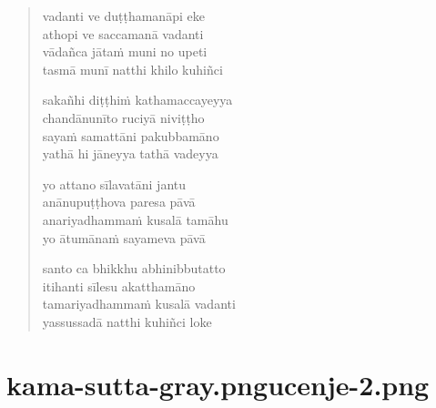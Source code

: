 

\cleartoverso

\vspace*{30mm}

\begin{verse}

vadanti ve duṭṭhamanāpi eke\\
athopi ve saccamanā vadanti\\
vādañca jātaṁ muni no upeti\\
tasmā munī natthi khilo kuhiñci

sakañhi diṭṭhiṁ kathamaccayeyya\\
chandānunīto ruciyā niviṭṭho\\
sayaṁ samattāni pakubbamāno\\
yathā hi jāneyya tathā vadeyya

yo attano sīlavatāni jantu\\
anānupuṭṭhova paresa pāvā\\
anariyadhammaṁ kusalā tamāhu\\
yo ātumānaṁ sayameva pāvā

santo ca bhikkhu abhinibbutatto\\
itihanti sīlesu akatthamāno\\
tamariyadhammaṁ kusalā vadanti\\
yassussadā natthi kuhiñci loke

\end{verse}


\chapter[Duṭṭhaṭṭhaka Sutta]{{kama-sutta-gray.png}{ucenje-2.png}}


